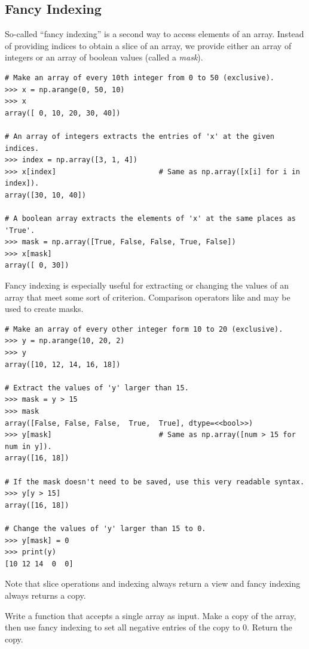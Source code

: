 \subsection*{Fancy Indexing} %

So-called ``fancy indexing'' is a second way to access elements of an array.
Instead of providing indices to obtain a slice of an array, we provide either an array of integers or an array of boolean values (called a \emph{mask}).

\begin{lstlisting}
# Make an array of every 10th integer from 0 to 50 (exclusive).
>>> x = np.arange(0, 50, 10)
>>> x
array([ 0, 10, 20, 30, 40])

# An array of integers extracts the entries of 'x' at the given indices.
>>> index = np.array([3, 1, 4])
>>> x[index]                        # Same as np.array([x[i] for i in index]).
array([30, 10, 40])

# A boolean array extracts the elements of 'x' at the same places as 'True'.
>>> mask = np.array([True, False, False, True, False])
>>> x[mask]
array([ 0, 30])
\end{lstlisting}

Fancy indexing is especially useful for extracting or changing the values of an array that meet some sort of criterion.
Comparison operators like \li{<} and \li{==} may be used to create masks.

\begin{lstlisting}
# Make an array of every other integer form 10 to 20 (exclusive).
>>> y = np.arange(10, 20, 2)
>>> y
array([10, 12, 14, 16, 18])

# Extract the values of 'y' larger than 15.
>>> mask = y > 15
>>> mask
array([False, False, False,  True,  True], dtype=<<bool>>)
>>> y[mask]                         # Same as np.array([num > 15 for num in y]).
array([16, 18])

# If the mask doesn't need to be saved, use this very readable syntax.
>>> y[y > 15]
array([16, 18])

# Change the values of 'y' larger than 15 to 0.
>>> y[mask] = 0
>>> print(y)
[10 12 14  0  0]
\end{lstlisting}

Note that slice operations and indexing always return a view and fancy indexing always returns a copy.

\begin{problem} %
Write a function that accepts a single array as input.
Make a copy of the array, then use fancy indexing to set all negative entries of the copy to $0$.
Return the copy.
\end{problem}

